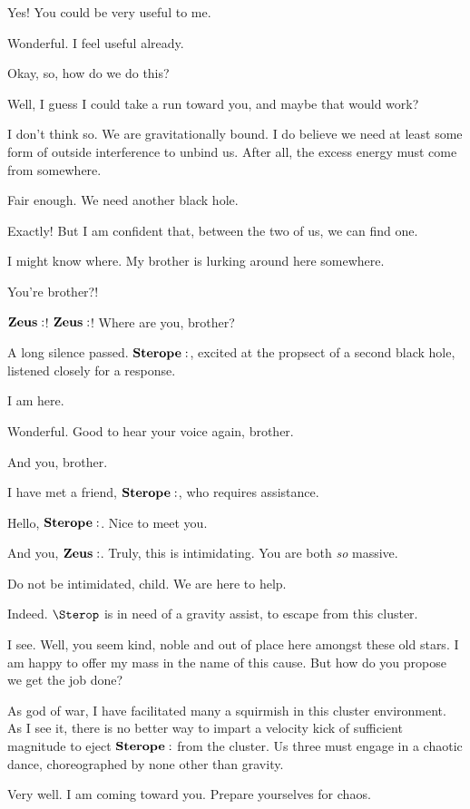 \documentclass[main.tex]{subfiles}
\begin{document}
\Sterope Yes!  You could be very useful to me.  

\Ares Wonderful.  I feel useful already.

\Sterope Okay, so, how do we do this?

\Ares Well, I guess I could take a run toward you, and maybe that would work?

\Sterope I don't think so.  We are gravitationally bound.  I do believe we need at least some form of outside interference to unbind us.  After all, the excess energy must come from somewhere.

\Ares Fair enough.  We need another black hole.

\Sterope Exactly!  But I am confident that, between the two of us, we can find one.

\Ares I might know where.  My brother is lurking around here somewhere. 

\Sterope You're brother?!

\Ares $\Zeus$! $\Zeus$!  Where are you, brother?

A long silence passed.  $\Sterope$, excited at the propsect of a second black hole, listened closely for a response.

\Zeus I am here.   

\Ares  Wonderful.  Good to hear your voice again, brother.

\Zeus And you, brother.

\Ares I have met a friend, $\Sterope$, who requires assistance.

\Zeus  Hello, $\Sterope$.  Nice to meet you.

\Sterope And you, $\Zeus$.  Truly, this is intimidating.  You are both \textit{so} massive.

\Zeus Do not be intimidated, child.  We are here to help.

\Ares Indeed.  $\Sterop$ is in need of a gravity assist, to escape from this cluster.

\Zeus I see.  Well, you seem kind, noble and out of place here amongst these old stars.  I am happy to offer my mass in the name of this cause.  But how do you propose we get the job done?

\Ares As god of war, I have facilitated many a squirmish in this cluster environment.  As I see it, there is no better way to impart a velocity kick of sufficient magnitude to eject $\Sterope$ from the cluster.  Us three must engage in a chaotic dance, choreographed by none other than gravity.

\Zeus  Very well.  I am coming toward you.  Prepare yourselves for chaos.
\end{document}
